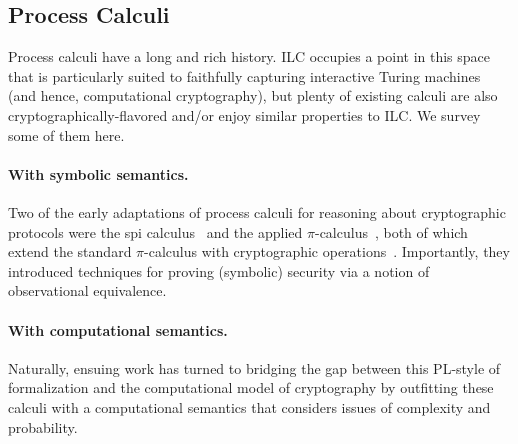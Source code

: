 \subsection{Process Calculi}
\label{subsec:process-calculi}

Process calculi have a long and rich history. ILC occupies a point in this space
that is particularly suited to faithfully capturing interactive Turing machines
(and hence, computational cryptography), but plenty of existing calculi are also
cryptographically-flavored and/or enjoy similar properties to ILC. We survey
some of them here.

\paragraph{With symbolic semantics.} Two of the early adaptations of process calculi for reasoning about
cryptographic protocols were the spi calculus~\cite{abadi1999calculus} and the
applied $\pi$-calculus~\cite{abadi2001mobile}, both of which extend the standard
$\pi$-calculus with cryptographic
operations~\cite{milner1999communicating}. Importantly, they introduced
techniques for proving (symbolic) security via a notion of observational
equivalence.

\paragraph{With computational semantics.}  Naturally, ensuing work has turned to bridging the gap between this PL-style of
formalization and the computational model of cryptography by outfitting these
calculi with a computational semantics that considers issues of complexity and
probability.



